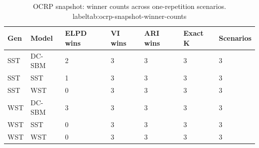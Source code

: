 \begin{table}[!h]
\centering
\caption{OCRP snapshot: winner counts across one-repetition scenarios.\\label{tab:ocrp-snapshot-winner-counts}}
\centering
\begin{tabular}[t]{lllllll}
\toprule
Gen & Model & ELPD wins & VI wins & ARI wins & Exact K & Scenarios\\
\midrule
SST & DC-SBM & 2 & 3 & 3 & 3 & 3\\
SST & SST & 1 & 3 & 3 & 3 & 3\\
SST & WST & 0 & 3 & 3 & 3 & 3\\
WST & DC-SBM & 3 & 3 & 3 & 3 & 3\\
WST & SST & 0 & 3 & 3 & 3 & 3\\
WST & WST & 0 & 3 & 3 & 3 & 3\\
\bottomrule
\end{tabular}
\end{table}
